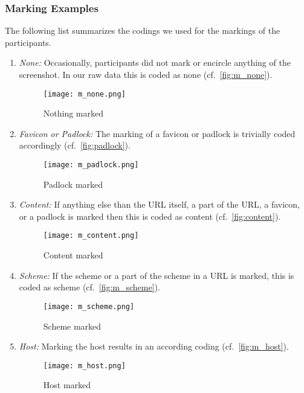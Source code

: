 \subsubsection{Marking Examples}
The following list summarizes the codings we used for the markings of the participants.

\begin{enumerate}
	\item\textit{None:} Occasionally, participants did not mark or encircle anything of the screenshot. In our raw data this is coded as none (cf.~\autoref{fig:m_none}).
	\begin{figure}[H]
				\centering
				\texttt{[image: m\_none.png]}
				\caption{Nothing marked}
				\label{fig:m_none}
				\end{figure}
	\item\textit{Favicon or Padlock:} The marking of a favicon or padlock is trivially coded accordingly (cf.~\autoref{fig:padlock}).
	\begin{figure}[H]
	\centering
	\texttt{[image: m\_padlock.png]}
	\caption{Padlock marked}
	\label{fig:padlock}
	\end{figure}
	\item\textit{Content:} If anything else than the URL itself, a part of the URL, a favicon, or a padlock is marked then this is coded as content (cf.~\autoref{fig:content}).
	\begin{figure}[H]
	\centering
	\texttt{[image: m\_content.png]}
	\caption{Content marked}
	\label{fig:content}
	\end{figure}
	\item\textit{Scheme:} If the scheme or a part of the scheme in a URL is marked, this is coded as scheme (cf.~\autoref{fig:m_scheme}).
	\begin{figure}[H]
			\centering
			\texttt{[image: m\_scheme.png]}
			\caption{Scheme marked}
			\label{fig:m_scheme}
			\end{figure}
	\item\textit{Host:} Marking the host results in an according coding (cf.~\autoref{fig:m_host}).
		\begin{figure}[H]
		\centering
		\texttt{[image: m\_host.png]}
		\caption{Host marked}
		\label{fig:m_host}
		\end{figure}

\end{enumerate}
